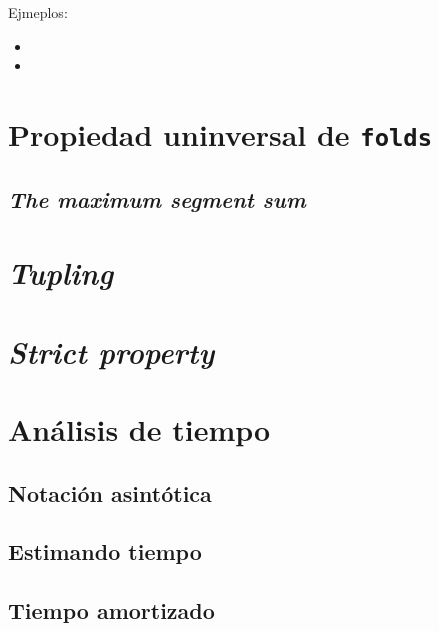 Ejmeplos:
\begin{itemize}
    \item {}
    \item {}
\end{itemize}






\section{Propiedad uninversal de \texttt{folds}}
\cite{univ_expre_fold}

\subsection{\textit{The maximum segment sum}}

\section{\textit{Tupling}}
\section{\textit{Strict property}}



\section{Análisis de tiempo}

\subsection{Notación asintótica}

\subsection{Estimando tiempo}

\subsection{Tiempo amortizado}
